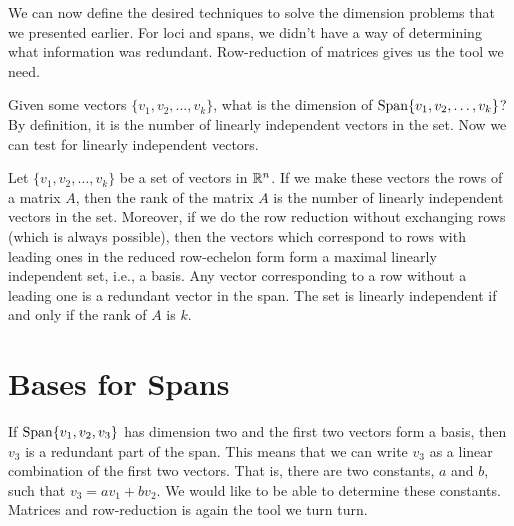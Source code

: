 \documentclass[fleqn]{report}
\begin{document}
We can now define the desired techniques to solve the
dimension problems that we presented earlier. For loci and
spans, we didn't have a way of determining what information
was redundant. Row-reduction of matrices gives us the tool we
need. 

Given some vectors $\{v_1, v_2, \ldots, v_k\}$, what is the dimension
of $\mathrm{Span} \{ v_1, v_2, \ldots, v_k\}$? By definition, it is the
number of linearly independent vectors in the set. Now we can
test for linearly independent vectors.

\begin{prop}
Let $\{v_1, v_2, \ldots, v_k\}$ be a set of vectors in $\mathbb{R}^n$.
If we make these vectors the rows of a matrix $A$, then the rank
of the matrix $A$ is the number of linearly independent vectors
in the set. Moreover, if we do the row reduction without
exchanging rows (which is always possible), then the vectors
which correspond to rows with leading ones in the reduced
row-echelon form form a maximal linearly independent set,
i.e., a basis. Any
vector corresponding to a row without a leading one is a
redundant vector in the span. The set is linearly independent
if and only if the rank of $A$ is $k$.
\end{prop}

\section{Bases for Spans}

If $\mathrm{Span}\{v_1, v_2, v_3\}$ has dimension two and the first
two vectors form a basis, then $v_3$ is a redundant part of
the span. This means that we can write $v_3$ as a linear
combination of the first two vectors. That is, there are two
constants, $a$ and $b$, such that $v_3 = av_1 + bv_2$. We
would like to be able to determine these constants. Matrices
and row-reduction is again the tool we turn turn.
\end{document}
